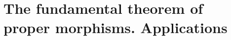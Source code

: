 \section{The fundamental theorem of proper morphisms. Applications}
\label{section:cohomological-study-of-projective-morphisms}

